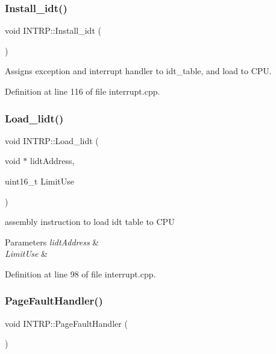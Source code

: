 \subsubsection{\texorpdfstring{Install\+\_\+idt()}{Install\_idt()}}
{\footnotesize\ttfamily void I\+N\+T\+R\+P\+::\+Install\+\_\+idt (\begin{DoxyParamCaption}{ }\end{DoxyParamCaption})}



Assigns exception and interrupt handler to idt\+\_\+table, and load to C\+PU. 



Definition at line 116 of file interrupt.\+cpp.

\mbox{\label{namespace_i_n_t_r_p_a194f85d6c873615e9125466e3b23c30f}} 
\subsubsection{\texorpdfstring{Load\+\_\+lidt()}{Load\_lidt()}}
{\footnotesize\ttfamily void I\+N\+T\+R\+P\+::\+Load\+\_\+lidt (\begin{DoxyParamCaption}\item[{void $\ast$}]{lidt\+Address,  }\item[{uint16\+\_\+t}]{Limit\+Use }\end{DoxyParamCaption})\hspace{0.3cm}{\ttfamily [inline]}}



assembly instruction to load idt table to C\+PU 


\begin{DoxyParams}{Parameters}
{\em lidt\+Address} & \\
\hline
{\em Limit\+Use} & \\
\hline
\end{DoxyParams}


Definition at line 98 of file interrupt.\+cpp.

\mbox{\label{namespace_i_n_t_r_p_aff35666b88439353d86e253d3051f27f}} 
\subsubsection{\texorpdfstring{Page\+Fault\+Handler()}{PageFaultHandler()}}
{\footnotesize\ttfamily void I\+N\+T\+R\+P\+::\+Page\+Fault\+Handler (\begin{DoxyParamCaption}{ }\end{DoxyParamCaption})}



